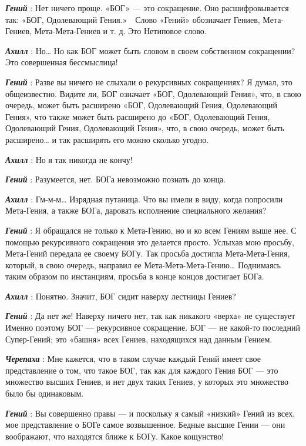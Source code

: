 \emph{\textbf{Гений}} : Нет ничего проще. «БОГ» --- это сокращение. Оно расшифровывается так: «БОГ, Одолевающий Гения.»~~Слово «Гений» обозначает Гениев, Мета-Гениев, Мета-Мета-Гениев и т. д. Это Нетиповое слово.

\emph{\textbf{Ахилл}} : Но\ldots{} Но как БОГ может быть словом в своем собственном сокращении? Это совершенная бессмыслица!

\emph{\textbf{Гений}} : Разве вы ничего не слыхали о рекурсивных сокращениях? Я думал, это общеизвестно. Видите ли, БОГ означает «БОГ, Одолевающий Гения», что, в свою очередь, может быть расширено «БОГ, Одолевающий Гения, Одолевающий Гения», что также может быть расширено до «БОГ, Одолевающий Гения, Одолевающий Гения, Одолевающий Гения», что, в свою очередь, может быть расширено\ldots{} и так расширять его можно сколько угодно.

\emph{\textbf{Ахилл}} : Но я так никогда не кончу!

\emph{\textbf{Гений}} : Разумеется, нет. БОГа невозможно познать до конца.

\emph{\textbf{Ахилл}} : Гм-м-м\ldots{} Изрядная путаница. Что вы имели в виду, когда попросили Мета-Гения, а также БОГа, даровать исполнение специального желания?

\emph{\textbf{Гений}} : Я обращался не только к Мета-Гению, но и ко всем Гениям выше нее. С помощью рекурсивного сокращения это делается просто. Услыхав мою просьбу, Мета-Гений передала ее своему БОГу. Так просьба достигла Мета-Мета-Гения, который, в свою очередь, направил ее Мета-Мета-Мета-Гению\ldots{} Поднимаясь таким образом по инстанциям, просьба в конце концов достигает БОГа.

\emph{\textbf{Ахилл}} : Понятно. Значит, БОГ сидит наверху лестницы Гениев?

\emph{\textbf{Гений}} : Да нет же! Наверху ничего нет, так как никакого «верха» не существует Именно поэтому БОГ --- рекурсивное сокращение. БОГ --- не какой-то последний Супер-Гений; это «башня» всех Гениев, находящихся над данным Гением.

\emph{\textbf{Черепаха}} : Мне кажется, что в таком случае каждый Гений имеет свое представление о том, что такое БОГ, так как для каждого Гения БОГ --- это множество высших Гениев, и нет двух таких Гениев, у которых это множество было бы одинаковым.

\emph{\textbf{Гений}} : Вы совершенно правы --- и поскольку я самый «низкий» Гений из всех, мое представление о БОГе самое возвышенное. Бедные высшие Гении --- они воображают, что находятся ближе к БОГу. Какое кощунство!

